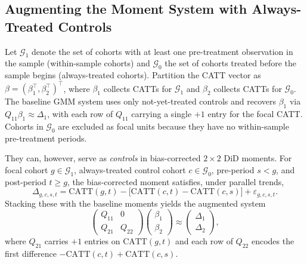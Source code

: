 %

\subsection{Augmenting the Moment System with Always-Treated Controls}
\label{subsec:always_treated_moments}

Let $\mathcal{G}_1$ denote the set of cohorts with at least one
pre-treatment observation in the sample (within-sample cohorts) and
$\mathcal{G}_0$ the set of cohorts treated before the sample begins
(always-treated cohorts). Partition the CATT vector as
$\beta = (\beta_1^\top, \beta_2^\top)^\top$, where $\beta_1$ collects
CATTs for $\mathcal{G}_1$ and $\beta_2$ collects CATTs for
$\mathcal{G}_0$. The baseline GMM system uses only not-yet-treated
controls and recovers $\beta_1$ via $Q_{11}\beta_1 \approx \Delta_1$,
with each row of $Q_{11}$ carrying a single $+1$ entry for the focal
CATT. Cohorts in $\mathcal{G}_0$ are excluded as focal units because
they have no within-sample pre-treatment periods.

They can, however, serve as \emph{controls} in bias-corrected
$2\times2$ DiD moments. For focal cohort $g\in\mathcal{G}_1$,
always-treated control cohort $c\in\mathcal{G}_0$, pre-period
$s < g$, and post-period $t\geq g$, the bias-corrected moment
satisfies, under parallel trends,
\begin{equation}
  \Delta_{g,c,s,t}
  = \mathrm{CATT}(g,t)
    - \bigl[\mathrm{CATT}(c,t) - \mathrm{CATT}(c,s)\bigr]
    + \varepsilon_{g,c,s,t}.
  \label{eq:biascorr_moment}
\end{equation}
Stacking these with the baseline moments yields the augmented system
\begin{equation}
  \begin{pmatrix} Q_{11} & 0 \\ Q_{21} & Q_{22} \end{pmatrix}
  \begin{pmatrix} \beta_1 \\ \beta_2 \end{pmatrix}
  \approx
  \begin{pmatrix} \Delta_1 \\ \Delta_2 \end{pmatrix},
  \label{eq:augmented_system}
\end{equation}
where $Q_{21}$ carries $+1$ entries on $\mathrm{CATT}(g,t)$ and each
row of $Q_{22}$ encodes the first difference
$-\mathrm{CATT}(c,t)+\mathrm{CATT}(c,s)$.

